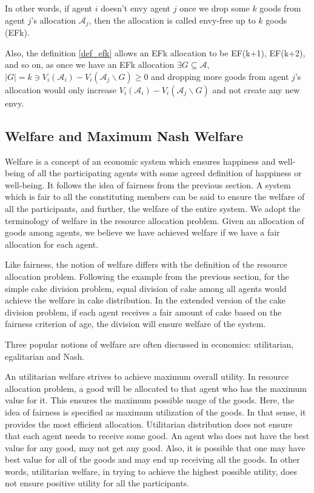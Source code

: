 In other words, if agent $i$ doesn't envy agent $j$ once we drop some $k$ goods from agent $j$'s allocation $\mathcal{A}_j$, then the allocation is called envy-free up to $k$ goods (EFk).

Also, the definition \ref{def_efk} allows an EFk allocation to be EF(k+1), EF(k+2), and so on, as once we have an EFk allocation $ \exists G \subseteq \mathcal{A}$, $ |G|=k \ni V_i(\mathcal{A}_i) - V_i(\mathcal{A}_j \backslash G) \geq 0 $ and dropping more goods from agent $j$'s allocation would only increase $V_i(\mathcal{A}_i) - V_i(\mathcal{A}_j \backslash G)$ and not create any new envy.


\subsection{Welfare and Maximum Nash Welfare}
Welfare is a concept of an economic system which ensures happiness and well-being of all the participating agents with some agreed definition of happiness or well-being. It follows the idea of fairness from the previous section. A system which is fair to all the constituting members can be said to ensure the welfare of all the participants, and further, the welfare of the entire system. We adopt the terminology of welfare in the resource allocation problem. Given an allocation of goods among agents, we believe we have achieved welfare if we have a fair allocation for each agent.

Like fairness, the notion of welfare differs with the definition of the resource allocation problem. Following the example from the previous section, for the simple cake division problem, equal division of cake among all agents would achieve the welfare in cake distribution. In the extended version of the cake division problem, if each agent receives a fair amount of cake based on the fairness criterion of age, the division will ensure welfare of the system.

Three popular notions of welfare are often discussed in economics: utilitarian, egalitarian and Nash.

An utilitarian welfare strives to achieve maximum overall utility. In resource allocation problem, a good will be allocated to that agent who has the maximum value for it. This ensures the maximum possible usage of the goods. Here, the idea of fairness is specified as maximum utilization of the goods. In that sense, it provides the most efficient allocation. Utilitarian distribution does not ensure that each agent needs to receive some good. An agent who does not have the best value for any good, may not get any good. Also, it is possible that one may have best value for all of the goods and may end up receiving all the goods. In other words, utilitarian welfare, in trying to achieve the highest possible utility, does not ensure positive utility for all the participants.

